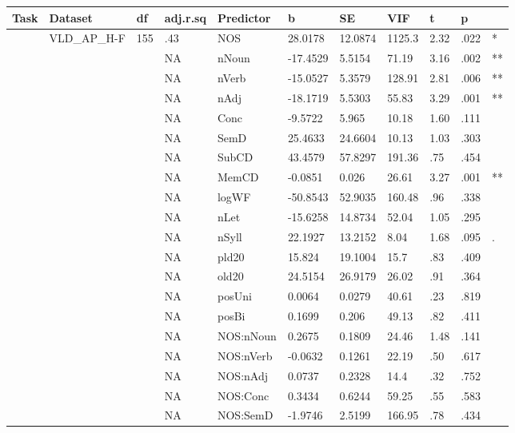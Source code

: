\begin{table}[ht]
\centering
\begingroup\normalsize
\begin{tabular}{lllllllllll}
  \hline
Task & Dataset & df & adj.r.sq & Predictor & b & SE & VIF & t & p &  \\ 
  \hline
 & VLD\_AP\_H-F & 155 & .43 & NOS & 28.0178 & 12.0874 & 1125.3 & 2.32 & .022 & * \\ 
   &  &  & NA & nNoun & -17.4529 & 5.5154 & 71.19 & 3.16 & .002 & ** \\ 
   &  &  & NA & nVerb & -15.0527 & 5.3579 & 128.91 & 2.81 & .006 & ** \\ 
   &  &  & NA & nAdj & -18.1719 & 5.5303 & 55.83 & 3.29 & .001 & ** \\ 
   &  &  & NA & Conc & -9.5722 & 5.965 & 10.18 & 1.60 & .111 &   \\ 
   &  &  & NA & SemD & 25.4633 & 24.6604 & 10.13 & 1.03 & .303 &   \\ 
   &  &  & NA & SubCD & 43.4579 & 57.8297 & 191.36 & .75 & .454 &   \\ 
   &  &  & NA & MemCD & -0.0851 & 0.026 & 26.61 & 3.27 & .001 & ** \\ 
   &  &  & NA & logWF & -50.8543 & 52.9035 & 160.48 & .96 & .338 &   \\ 
   &  &  & NA & nLet & -15.6258 & 14.8734 & 52.04 & 1.05 & .295 &   \\ 
   &  &  & NA & nSyll & 22.1927 & 13.2152 & 8.04 & 1.68 & .095 & . \\ 
   &  &  & NA & pld20 & 15.824 & 19.1004 & 15.7 & .83 & .409 &   \\ 
   &  &  & NA & old20 & 24.5154 & 26.9179 & 26.02 & .91 & .364 &   \\ 
   &  &  & NA & posUni & 0.0064 & 0.0279 & 40.61 & .23 & .819 &   \\ 
   &  &  & NA & posBi & 0.1699 & 0.206 & 49.13 & .82 & .411 &   \\ 
   &  &  & NA & NOS:nNoun & 0.2675 & 0.1809 & 24.46 & 1.48 & .141 &   \\ 
   &  &  & NA & NOS:nVerb & -0.0632 & 0.1261 & 22.19 & .50 & .617 &   \\ 
   &  &  & NA & NOS:nAdj & 0.0737 & 0.2328 & 14.4 & .32 & .752 &   \\ 
   &  &  & NA & NOS:Conc & 0.3434 & 0.6244 & 59.25 & .55 & .583 &   \\ 
   &  &  & NA & NOS:SemD & -1.9746 & 2.5199 & 166.95 & .78 & .434 &   \\ 

\end{tabular}
\end{table}
